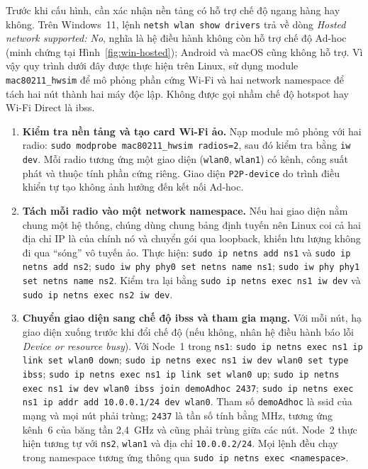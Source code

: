 Trước khi cấu hình, cần xác nhận nền tảng có hỗ trợ chế độ ngang hàng hay không.
Trên Windows~11, lệnh \texttt{netsh wlan show drivers} trả về dòng
\emph{Hosted network supported: No}, nghĩa là hệ điều hành không còn hỗ trợ chế
độ Ad-hoc (minh chứng tại Hình~\ref{fig:win-hosted}); Android và macOS cũng
không hỗ trợ. Vì vậy quy trình dưới đây được thực hiện trên Linux, sử dụng module
\texttt{mac80211\_hwsim} để mô phỏng phần cứng Wi-Fi và hai network namespace để
tách hai nút thành hai máy độc lập. Không được gọi nhầm chế độ hotspot hay
Wi-Fi Direct là \ac{ibss}.

\begin{enumerate}[leftmargin=*]
  \item \textbf{Kiểm tra nền tảng và tạo card Wi-Fi ảo.} Nạp module mô phỏng với
    hai radio: \texttt{sudo modprobe mac80211\_hwsim radios=2}, sau đó kiểm tra
    bằng \texttt{iw dev}. Mỗi radio tương ứng một giao diện (\texttt{wlan0},
    \texttt{wlan1}) có kênh, công suất phát và thuộc tính phần cứng riêng.
    Giao diện \texttt{P2P-device} do trình điều khiển tự tạo không ảnh hưởng
    đến kết nối Ad-hoc.

  \item \textbf{Tách mỗi radio vào một network namespace.} Nếu hai giao diện nằm
    chung một hệ thống, chúng dùng chung bảng định tuyến nên Linux coi cả hai
    địa chỉ IP là của chính nó và chuyển gói qua loopback, khiến lưu lượng không
    đi qua ``sóng'' vô tuyến ảo. Thực hiện:
    \texttt{sudo ip netns add ns1} và \texttt{sudo ip netns add ns2};
    \texttt{sudo iw phy phy0 set netns name ns1};
    \texttt{sudo iw phy phy1 set netns name ns2}. Kiểm tra lại bằng
    \texttt{sudo ip netns exec ns1 iw dev} và
    \texttt{sudo ip netns exec ns2 iw dev}.

  \item \textbf{Chuyển giao diện sang chế độ \ac{ibss} và tham gia mạng.} Với
    mỗi nút, hạ giao diện xuống trước khi đổi chế độ (nếu không, nhân hệ điều
    hành báo lỗi \emph{Device or resource busy}). Với Node~1 trong \texttt{ns1}:
    \texttt{sudo ip netns exec ns1 ip link set wlan0 down};
    \texttt{sudo ip netns exec ns1 iw dev wlan0 set type ibss};
    \texttt{sudo ip netns exec ns1 ip link set wlan0 up};
    \texttt{sudo ip netns exec ns1 iw dev wlan0 ibss join demoAdhoc 2437};
    \texttt{sudo ip netns exec ns1 ip addr add 10.0.0.1/24 dev wlan0}. Tham số
    \texttt{demoAdhoc} là \ac{ssid} của mạng và mọi nút phải trùng; \texttt{2437}
    là tần số tính bằng MHz, tương ứng kênh~6 của băng tần 2,4~GHz và cũng phải
    trùng giữa các nút. Node~2 thực hiện tương tự với \texttt{ns2},
    \texttt{wlan1} và địa chỉ \texttt{10.0.0.2/24}. Mọi lệnh đều chạy trong
    namespace tương ứng thông qua \texttt{sudo ip netns exec <namespace>}.


\end{enumerate}
